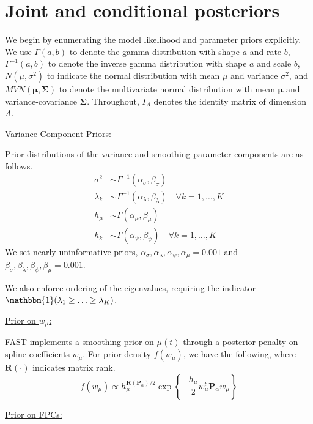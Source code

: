 \documentclass[12pt]{article}
\begin{document}
\section{Joint and conditional posteriors}\label{supp:CondPost}

We begin by enumerating the model likelihood and parameter priors explicitly. We use $\Gamma(a,b)$ to denote the gamma distribution with shape $a$ and rate $b$, $\Gamma^{-1}(a,b)$ to denote the inverse gamma distribution with shape $a$ and scale $b$, $N(\mu, \sigma^2)$ to indicate the normal distribution with mean $\mu$ and variance $\sigma^2$, and $MVN(\boldsymbol{\mu}, \boldsymbol{\Sigma})$ to denote the multivariate normal distribution with mean $\boldsymbol{\mu}$ and variance-covariance $\boldsymbol{\Sigma}$. Throughout, $I_A$ denotes the identity matrix of dimension $A$.

\vspace{0.5em}
\underline{Variance Component Priors:}

Prior distributions of the variance and smoothing parameter components are as follows.
\begin{align*}
    \sigma^2 & \sim \Gamma^{-1}(\alpha_\sigma,\beta_\sigma)\\
    \lambda_k & \sim \Gamma^{-1}(\alpha_\lambda,\beta_\lambda) \quad \forall k = 1,\ldots,K\\
    h_\mu & \sim \Gamma(\alpha_\mu,\beta_\mu) \\
     h_k & \sim \Gamma(\alpha_\psi,\beta_\psi) \quad \forall k = 1,\ldots,K
\end{align*}
We set nearly uninformative priors, $\alpha_\sigma, \alpha_\lambda, \alpha_\psi, \alpha_\mu = 0.001$ and $\beta_\sigma, \beta_\lambda, \beta_\psi, \beta_\mu = 0.001$.

We also enforce ordering of the eigenvalues, requiring the indicator $\mathbbm{1}(\lambda_1 \geq \ldots\geq \lambda_K)$.

\vspace{0.5em}
\underline{Prior on $w_\mu$:}

FAST implements a smoothing prior on $\mu(t)$ through a posterior penalty on spline coefficients $w_\mu$. For prior density $f(w_\mu)$, we have the following, where $\mathbf{R}(\cdot)$ indicates matrix rank.
$$f(w_\mu) \propto h_\mu^{\mathbf{R}(\mathbf{P}_\alpha)/2}\exp\left\{-\frac{h_{\mu}}{2} w^t_{\mu}\mathbf{P}_{\alpha} w_{\mu}\right\}$$

\vspace{0.5em}
\underline{Prior on FPCs:}
\end{document}

